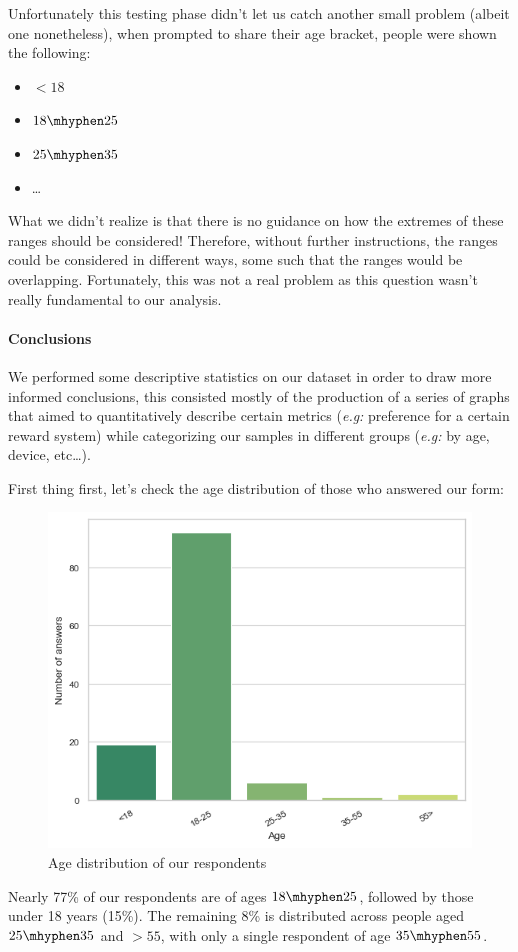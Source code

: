 \documentclass[a4paper, 11pt]{report}
\begin{document}
Unfortunately this testing phase didn't let us catch another small problem (albeit one nonetheless),
when prompted to share their age bracket, people were shown the following:
\begin{itemize}
	\item $< 18$
	\item $18 \mhyphen 25$
	\item $25 \mhyphen 35$
	\item \dots
\end{itemize}

What we didn't realize is that there is no guidance on how the extremes of these ranges should be considered!
Therefore, without further instructions, the ranges could be considered in different ways, some such that
the ranges would be overlapping.
Fortunately, this was not a real problem as this question wasn't really fundamental to our analysis.

\paragraph{Conclusions}
We performed some descriptive statistics on our dataset in order to draw more informed conclusions,
this consisted mostly of the production of a series of graphs that aimed to quantitatively
describe certain metrics (\emph{e.g:} preference for a certain reward system) while categorizing
our samples in different groups (\emph{e.g:} by age, device, etc\dots).


First thing first, let's check the age distribution of those who answered our form:

\begin{figure}[H]
	\centering
	\includegraphics[width=.5\textwidth]{img/analysis/age_distribution.png}
	\caption{Age distribution of our respondents}
\end{figure}

Nearly 77\% of our respondents are of ages $18 \mhyphen 25$, followed by those under 18 years (15\%). The remaining 8\% is distributed across people aged
$25 \mhyphen 35$ and $>55$, with only a single respondent of age $35 \mhyphen 55$.
\end{document}
